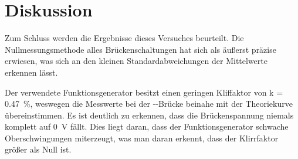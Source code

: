 
\section{Diskussion}
Zum Schluss werden die Ergebnisse dieses Versuches beurteilt.
Die Nullmessungsmethode alles Brückenschaltungen hat sich als äußerst präzise erwiesen, was sich an den kleinen Standardabweichungen der Mittelwerte erkennen lässt.

Der verwendete Funktionsgenerator besitzt einen geringen Kliffaktor von k = \SI{0.47}{\percent}, weswegen die Messwerte bei der --Brücke beinahe mit der Theoriekurve übereinstimmen. Es ist deutlich zu erkennen, dass die Brückenspannung niemals komplett auf \SI{0}{\volt} fällt. Dies liegt daran, dass der Funktionsgenerator schwache Oberschwingungen miterzeugt, was man daran erkennt, dass der Klirrfaktor größer als Null ist.